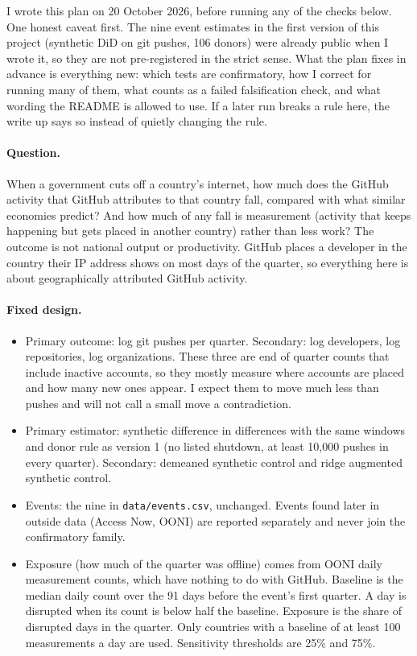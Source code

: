 
I wrote this plan on 20 October 2026, before running any of the checks below. One honest caveat first. The nine event estimates in the first version of this project (synthetic DiD on git pushes, 106 donors) were already public when I wrote it, so they are not pre-registered in the strict sense. What the plan fixes in advance is everything new: which tests are confirmatory, how I correct for running many of them, what counts as a failed falsification check, and what wording the README is allowed to use. If a later run breaks a rule here, the write up says so instead of quietly changing the rule.

\paragraph{Question.} When a government cuts off a country's internet, how much does the GitHub activity that GitHub attributes to that country fall, compared with what similar economies predict? And how much of any fall is measurement (activity that keeps happening but gets placed in another country) rather than less work? The outcome is not national output or productivity. GitHub places a developer in the country their IP address shows on most days of the quarter, so everything here is about geographically attributed GitHub activity.

\paragraph{Fixed design.}
\begin{itemize}
\item Primary outcome: log git pushes per quarter. Secondary: log developers, log repositories, log organizations. These three are end of quarter counts that include inactive accounts, so they mostly measure where accounts are placed and how many new ones appear. I expect them to move much less than pushes and will not call a small move a contradiction.
\item Primary estimator: synthetic difference in differences with the same windows and donor rule as version 1 (no listed shutdown, at least 10,000 pushes in every quarter). Secondary: demeaned synthetic control and ridge augmented synthetic control.
\item Events: the nine in \texttt{data/events.csv}, unchanged. Events found later in outside data (Access Now, OONI) are reported separately and never join the confirmatory family.
\item Exposure (how much of the quarter was offline) comes from OONI daily measurement counts, which have nothing to do with GitHub. Baseline is the median daily count over the 91 days before the event's first quarter. A day is disrupted when its count is below half the baseline. Exposure is the share of disrupted days in the quarter. Only countries with a baseline of at least 100 measurements a day are used. Sensitivity thresholds are 25\% and 75\%.
\end{itemize}

